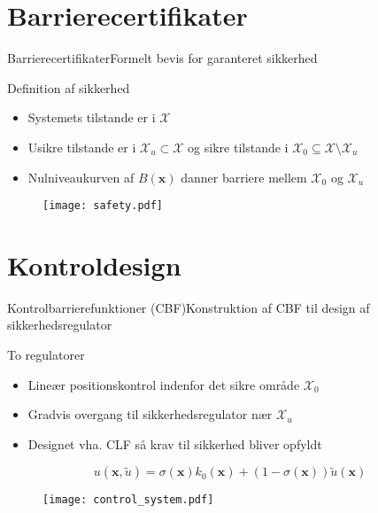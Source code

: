 \section{Barrierecertifikater}
\begin{frame}{Barrierecertifikater}{Formelt bevis for garanteret sikkerhed}
\vspace{2mm}
\begin{block}{Definition af sikkerhed}
	\begin{itemize}
		\item Systemets tilstande er i $\mathcal{X}$
		\item Usikre tilstande er i $\mathcal{X}_u\subset\mathcal{X}$ og sikre tilstande i $\mathcal{X}_0\subseteq\mathcal{X}\setminus\mathcal{X}_u$
		\item Nulniveaukurven af $B(\textbf{x})$ danner  barriere mellem $\mathcal{X}_0$ og $\mathcal{X}_u$
	\end{itemize}
\end{block}
\begin{figure}[h]
	\centering
	\texttt{[image: safety.pdf]}
\end{figure}
\vspace{1cm}
\end{frame}

\section{Kontroldesign}
\begin{frame}{Kontrolbarrierefunktioner (CBF)}{Konstruktion af CBF til design af sikkerhedsregulator}
	\vspace{2mm}
\begin{block}{To regulatorer}
	\begin{itemize}
		\item Lineær positionskontrol indenfor det sikre område $\mathcal{X}_0$
		\item Gradvis overgang til sikkerhedsregulator nær $\mathcal{X}_u$
		\item Designet vha. CLF så krav til sikkerhed bliver opfyldt
	\end{itemize}
\end{block}
\vspace{-2mm}
\begin{equation*}
u(\mathbf{x},\tilde{u})=\sigma(\mathbf{x})k_0(\mathbf{x})+(1-\sigma(\mathbf{x}))\tilde{u}(\mathbf{x})
\end{equation*}

\begin{figure}[h]
	\centering
	\texttt{[image: control\_system.pdf]}
\end{figure}
	\vspace{5mm}
\end{frame}